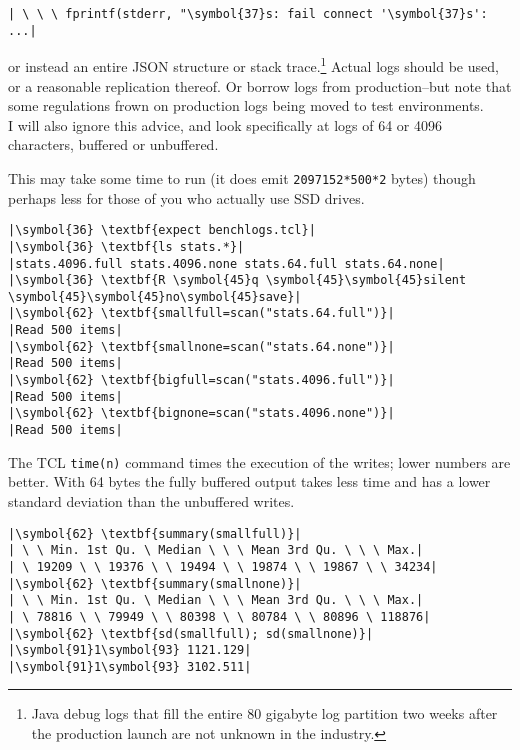 \documentclass[10pt,a4paper]{article}
\begin{document}
\begin{lstlisting}
| \ \ \ fprintf(stderr, "\symbol{37}s: fail connect '\symbol{37}s': ...|
\end{lstlisting}

or instead an entire JSON structure or stack trace.\footnote{Java debug
logs that fill the entire 80 gigabyte log partition two weeks after the
production launch are not unknown in the industry.} Actual logs should
be used, or a reasonable replication thereof. Or borrow logs from
production--but note that some regulations frown on production logs
being moved to test environments. \\

I will also ignore this advice, and look specifically at logs of 64 or
4096 characters, buffered or unbuffered.



This may take some time to run (it does emit \texttt{2097152*500*2}
bytes) though perhaps less for those of you who actually use SSD drives.

\begin{lstlisting}
|\symbol{36} \textbf{expect benchlogs.tcl}|
|\symbol{36} \textbf{ls stats.*}|
|stats.4096.full stats.4096.none stats.64.full stats.64.none|
|\symbol{36} \textbf{R \symbol{45}q \symbol{45}\symbol{45}silent \symbol{45}\symbol{45}no\symbol{45}save}|
|\symbol{62} \textbf{smallfull=scan("stats.64.full")}|
|Read 500 items|
|\symbol{62} \textbf{smallnone=scan("stats.64.none")}|
|Read 500 items|
|\symbol{62} \textbf{bigfull=scan("stats.4096.full")}|
|Read 500 items|
|\symbol{62} \textbf{bignone=scan("stats.4096.none")}|
|Read 500 items|
\end{lstlisting}

The TCL \texttt{time(n)} command times the execution of the writes;
lower numbers are better. With 64 bytes the fully buffered output takes
less time and has a lower standard deviation than the unbuffered writes.

\begin{lstlisting}
|\symbol{62} \textbf{summary(smallfull)}|
| \ \ Min. 1st Qu. \ Median \ \ \ Mean 3rd Qu. \ \ \ Max.|
| \ 19209 \ \ 19376 \ \ 19494 \ \ 19874 \ \ 19867 \ \ 34234|
|\symbol{62} \textbf{summary(smallnone)}|
| \ \ Min. 1st Qu. \ Median \ \ \ Mean 3rd Qu. \ \ \ Max.|
| \ 78816 \ \ 79949 \ \ 80398 \ \ 80784 \ \ 80896 \ 118876|
|\symbol{62} \textbf{sd(smallfull); sd(smallnone)}|
|\symbol{91}1\symbol{93} 1121.129|
|\symbol{91}1\symbol{93} 3102.511|
\end{lstlisting}
\end{document}
